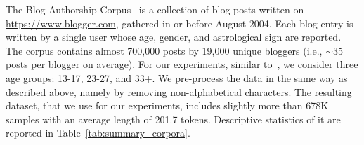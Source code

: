 The Blog Authorship Corpus~\citep{schler2006effects} is a collection of blog posts
written on \url{https://www.blogger.com}, gathered in or before August 2004. %
Each blog entry is
written by a single user
whose age, gender, and astrological sign are reported.
The corpus contains almost 700,000 posts by 19,000 unique bloggers (i.e., $\sim$35 posts per blogger on average).
For our experiments, similar to~\citet{schler2006effects},
we consider three age groups: 13-17, 23-27, and 33+. We pre-process the data in the same way as described above, namely by removing non-alphabetical characters. The resulting dataset, that we use for our experiments, includes slightly more than 678K samples with an average length of 201.7 tokens. Descriptive statistics of it are reported in Table~\ref{tab:summary_corpora}. 


